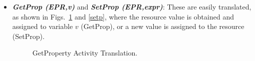 \begin{itemize}
\vspace{-0.4cm}

\item {\bf {\it GetProp (EPR,v)}} and {\bf {\it SetProp (EPR,expr)}}:
These are easily translated, as shown in Figs.~\ref{getp} and \ref{setp}, where the resource value is obtained and assigned to variable $v$ (GetProp), or a new value is assigned to the resource (SetProp).


\begin{figure}[!ht]
\begin{center}
\end{center}
\caption{\label{getp} GetProperty Activity Translation.}
\end{figure}

\vspace{-0.1cm}
%


\end{itemize}
